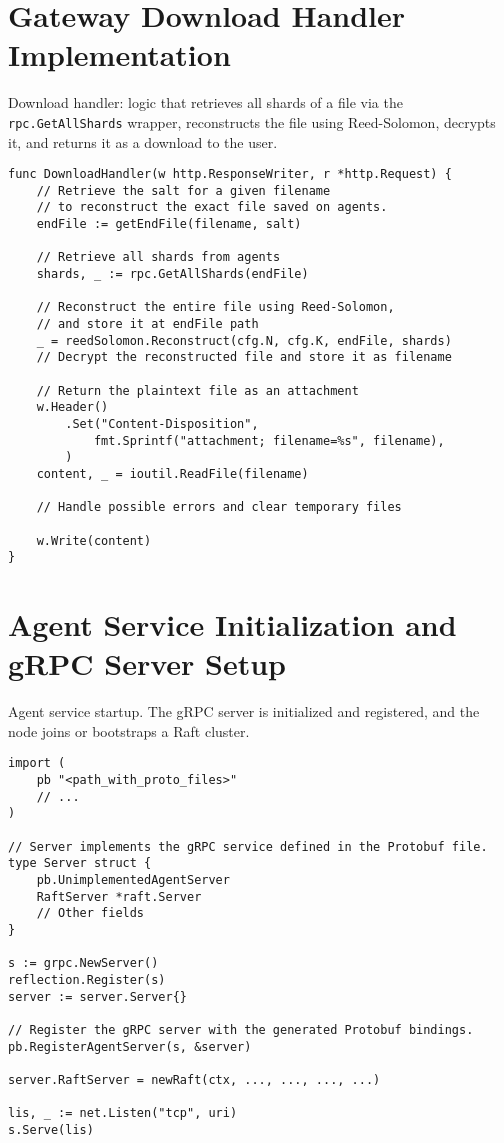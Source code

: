 \section{Gateway Download Handler Implementation} \label{code:download-handler}

\begin{listing}[H]
\caption{Download handler: logic that retrieves all shards of a file via the \texttt{rpc.GetAllShards} wrapper, reconstructs the file using Reed-Solomon, decrypts it, and returns it as a download to the user.}
\begin{verbatim}
func DownloadHandler(w http.ResponseWriter, r *http.Request) {
    // Retrieve the salt for a given filename 
    // to reconstruct the exact file saved on agents.
    endFile := getEndFile(filename, salt)

    // Retrieve all shards from agents
    shards, _ := rpc.GetAllShards(endFile)

    // Reconstruct the entire file using Reed-Solomon,
    // and store it at endFile path
    _ = reedSolomon.Reconstruct(cfg.N, cfg.K, endFile, shards)
    // Decrypt the reconstructed file and store it as filename

    // Return the plaintext file as an attachment
    w.Header()
        .Set("Content-Disposition",
            fmt.Sprintf("attachment; filename=%s", filename),
        )
    content, _ = ioutil.ReadFile(filename)

    // Handle possible errors and clear temporary files

    w.Write(content)
}
\end{verbatim}
\end{listing}


\section{Agent Service Initialization and gRPC Server Setup} \label{code:agent-main-go}

\begin{listing}[H]
\caption{Agent service startup. The gRPC server is initialized and registered, and the node joins or bootstraps a Raft cluster.}
\begin{verbatim}
import (
    pb "<path_with_proto_files>"
    // ...
)

// Server implements the gRPC service defined in the Protobuf file.
type Server struct {
    pb.UnimplementedAgentServer
    RaftServer *raft.Server
    // Other fields
}

s := grpc.NewServer()
reflection.Register(s)
server := server.Server{}

// Register the gRPC server with the generated Protobuf bindings.
pb.RegisterAgentServer(s, &server)

server.RaftServer = newRaft(ctx, ..., ..., ..., ...)

lis, _ := net.Listen("tcp", uri)
s.Serve(lis)
\end{verbatim}
\end{listing}


